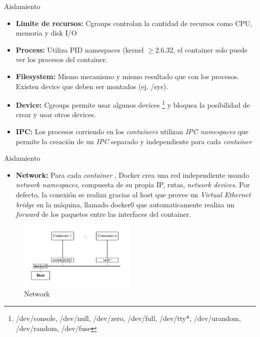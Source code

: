 \documentclass{bredelebeamer}
\newcommand{\container}{\textit{container }}
\newcommand{\containers}{\textit{containers }}
\begin{document}
\begin{frame}{Aislamiento}
	\begin{itemize}
		\item \textbf{Limite de recursos:}  Cgroups controlan la cantidad de recursos como CPU, memoria y disk I/O 
		\item \textbf{Process:} Utiliza PID namespaces (kernel \(\geq 2.6.32\), el container solo puede ver los procesos del container.
		\item \textbf{Filesystem:} Mismo mecanismo y mismo resultado que con los procesos. Existen device que deben ser montados (ej. /sys).
		\item \textbf{Device:} Cgroups permite usar algunos devices \footnote{/dev/console, /dev/null, /dev/zero, /dev/full, /dev/tty*, /dev/urandom, /dev/random, /dev/fuse} y bloquea la posibilidad de crear y usar otros devices.
		\item \textbf{IPC:} Los procesos corriendo en los \containers utilizan \textit{IPC namespaces} que permite la creación de un \textit{IPC} separado y independiente para cada \container 

	\end{itemize}
\end{frame}

\begin{frame}{Aislamiento}
	\begin{itemize}
	
		\item \textbf{Network:}
		Para cada \container, Docker crea una red independiente usando \textit{network namespaces}, compuesta de su propia IP, rutas, \textit{network devices}.
		Por defecto, la conexión se realiza gracias al host que provee un \textit{Virtual Ethernet bridge} en la máquina, llamado docker0 que automaticamente realiza un \textit{forward} de los paquetes entre las interfaces del container.
	\end{itemize}
	
	\begin{figure}[H]
  \centering
  \includegraphics[width=0.5\textwidth]{images/network.png}
    \caption{Network}
    \label{fig:dynamic}
\end{figure}	
\end{frame}
\end{document}
